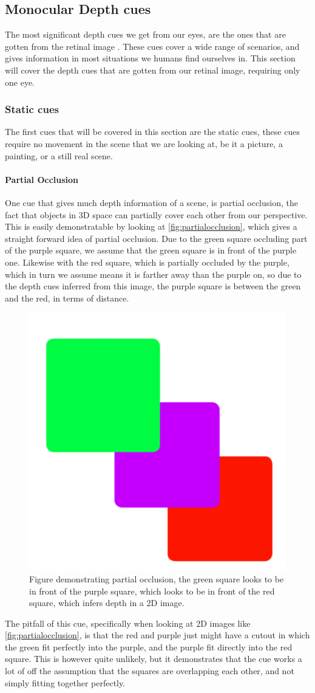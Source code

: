 	\subsection{Monocular Depth cues}
		The most significant depth cues we get from our eyes, are the ones that are gotten from the retinal image \citep{sensationPerception}. These cues cover a wide range of scenarios, and gives information in most situations we humans find ourselves in. This section will cover the depth cues that are gotten from our retinal image, requiring only one eye.
		\subsubsection{Static cues}
			The first cues that will be covered in this section are the static cues, these cues require no movement in the scene that we are looking at, be it a picture, a painting, or a still real scene.
			\paragraph{Partial Occlusion}
				One cue that gives much depth information of a scene, is partial occlusion, the fact that objects in 3D space can partially cover each other from our perspective. This is easily demonstratable by looking at \autoref{fig:partialocclusion}, which gives a straight forward idea of partial occlusion. Due to the green square occluding part of the purple square, we assume that the green square is in front of the purple one. Likewise with the red square, which is partially occluded by the purple, which in turn we assume means it is farther away than the purple on, so due to the depth cues inferred from this image, the purple square is between the green and the red, in terms of distance.
				\begin{figure}[H]
					\centering
					\includegraphics[width=0.4\linewidth]{figure/partialocclusion}
					\caption{Figure demonstrating partial occlusion, the green square looks to be in front of the purple square, which looks to be in front of the red square, which infers depth in a 2D image.}
					\label{fig:partialocclusion}
				\end{figure}
				The pitfall of this cue, specifically when looking at 2D images like \autoref{fig:partialocclusion}, is that the red and purple just might have a cutout in which the green fit perfectly into the purple, and the purple fit directly into the red square. This is however quite unlikely, but it demonstrates that the cue works a lot of off the assumption that the squares are overlapping each other, and not simply fitting together perfectly.
